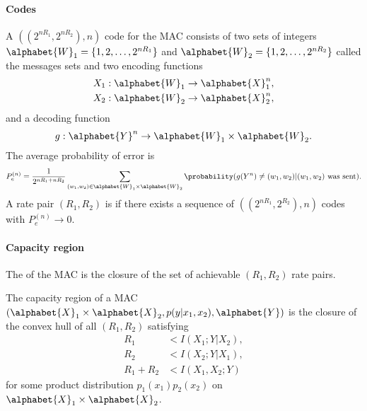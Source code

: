 \documentclass[a4paper, 11pt, openany]{book}
\begin{document}
\paragraph{Codes}

A $((2^{nR_1}, 2^{nR_2}), n  )$ code for the MAC consists of two sets of integers $\alphabet{W}_1 = \{ 1, 2, \dots, 2^{nR_1} \}$ and $\alphabet{W}_2 = \{ 1, 2, \dots, 2^{nR_2} \}$ called the messages sets and two encoding functions
\begin{align*}
	X_1 : \alphabet{W}_1 \to \alphabet{X}_1^n,\\
	X_2 : \alphabet{W}_2 \to \alphabet{X}_2^n,
\end{align*}
and a decoding function
\[
	g: \alphabet{Y}^n \to \alphabet{W}_1 \times \alphabet{W}_2.
\]
The average probability of error is
\[
	P_e^{(n)} = \frac{1}{2^{nR_1 + nR_2}} \sum_{(w_1, w_2) \in \alphabet{W}_1 \times \alphabet{W}_2} \probability( g(Y^n) \ne (w_1, w_2) | (w_1, w_2) \text{ was sent} ).
\]
A rate pair $(R_1, R_2)$ is  if there exists a sequence of $((2^{nR_1}, 2^{R_2}), n  )$ codes with $P_e^{(n)} \to 0$.


\paragraph{Capacity region}
The  of the MAC is the closure of the set of achievable $(R_1, R_2)$ rate pairs.

\begin{theorem}
The capacity region of a MAC $( \alphabet{X}_1 \times \alphabet{X}_2 , p(y | x_1, x_2), \alphabet{Y} )$ is the closure of the convex hull of all $(R_1, R_2)$ satisfying
\begin{align*}
	R_1 &< I(X_1 ; Y | X_2),\\
	R_2 &< I(X_2 ; Y | X_1),\\
	R_1 + R_2 &< I(X_1, X_2 ; Y)
\end{align*}
for some product distribution $p_1(x_1) p_2(x_2)$ on $\alphabet{X}_1 \times \alphabet{X}_2$.
\end{theorem}


\begin{center}
\end{center}
\end{document}
